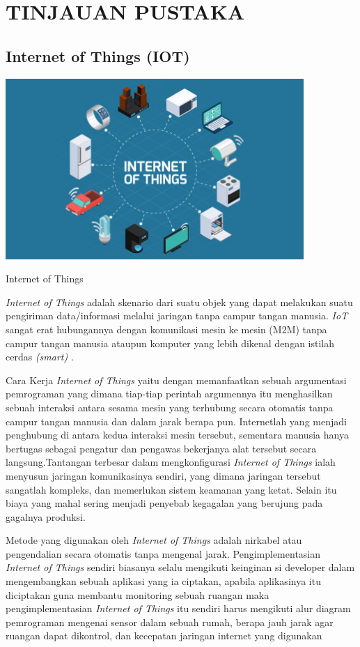 \chapter{TINJAUAN PUSTAKA}

\section{Internet of Things (IOT)}
\begin{afigure} 
    \includegraphics[width=0.85\textwidth, center]{images/iot.jpeg}
    \caption{Internet of Things}
    \label{fig:iot}
\end{afigure}

\textit{Internet of Things} adalah skenario dari suatu objek yang dapat melakukan suatu pengiriman data/informasi melalui jaringan tanpa campur tangan manusia. \textit{IoT} sangat erat hubungannya dengan komunikasi mesin ke mesin (M2M) tanpa campur tangan manusia ataupun komputer yang lebih dikenal dengan istilah cerdas \textit{(smart)} .

Cara Kerja \textit{Internet of Things} yaitu dengan memanfaatkan sebuah argumentasi pemrograman yang dimana tiap-tiap perintah argumennya itu menghasilkan sebuah interaksi antara sesama mesin yang terhubung secara otomatis tanpa campur tangan manusia dan dalam jarak berapa pun. Internetlah yang menjadi penghubung di antara kedua interaksi mesin tersebut, sementara manusia hanya bertugas sebagai pengatur dan pengawas bekerjanya alat tersebut secara langsung.Tantangan terbesar dalam mengkonfigurasi \textit{Internet of Things} ialah menyusun jaringan komunikasinya sendiri, yang dimana jaringan tersebut sangatlah kompleks, dan memerlukan sistem keamanan yang ketat. Selain itu biaya yang mahal sering menjadi penyebab kegagalan yang berujung pada gagalnya produksi.

Metode yang digunakan oleh \textit{Internet of Things} adalah nirkabel atau pengendalian secara otomatis tanpa mengenal jarak. Pengimplementasian \textit{Internet of Things} sendiri biasanya selalu mengikuti keinginan si developer dalam mengembangkan sebuah aplikasi yang ia ciptakan, apabila aplikasinya itu diciptakan guna membantu monitoring sebuah ruangan maka pengimplementasian \textit{Internet of Things} itu sendiri harus mengikuti alur diagram pemrograman mengenai sensor dalam sebuah rumah, berapa jauh jarak agar ruangan dapat dikontrol, dan kecepatan jaringan internet yang digunakan

